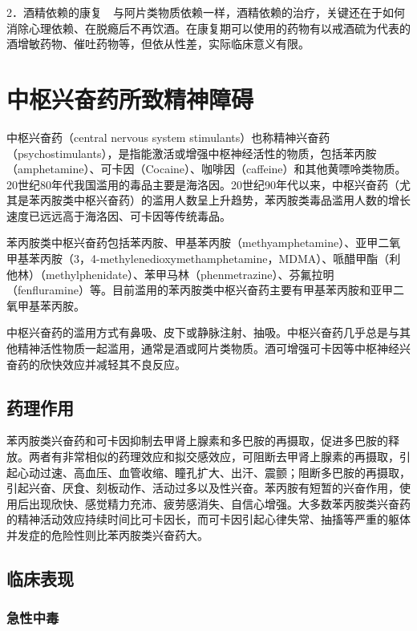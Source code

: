 2．酒精依赖的康复　与阿片类物质依赖一样，酒精依赖的治疗，关键还在于如何消除心理依赖、在脱瘾后不再饮酒。在康复期可以使用的药物有以戒酒硫为代表的酒增敏药物、催吐药物等，但依从性差，实际临床意义有限。

\section{中枢兴奋药所致精神障碍}

中枢兴奋药（central nervous system
stimulants）也称精神兴奋药（psychostimulants），是指能激活或增强中枢神经活性的物质，包括苯丙胺（amphetamine）、可卡因（Cocaine）、咖啡因（caffeine）和其他黄嘌呤类物质。20世纪80年代我国滥用的毒品主要是海洛因。20世纪90年代以来，中枢兴奋药（尤其是苯丙胺类中枢兴奋药）的滥用人数呈上升趋势，苯丙胺类毒品滥用人数的增长速度已远远高于海洛因、可卡因等传统毒品。

苯丙胺类中枢兴奋药包括苯丙胺、甲基苯丙胺（methyamphetamine）、亚甲二氧甲基苯丙胺（3，4-methylenedioxymethamphetamine，MDMA）、哌醋甲酯（利他林）（methylphenidate）、苯甲马林（phenmetrazine）、芬氟拉明（fenfluramine）等。目前滥用的苯丙胺类中枢兴奋药主要有甲基苯丙胺和亚甲二氧甲基苯丙胺。

中枢兴奋药的滥用方式有鼻吸、皮下或静脉注射、抽吸。中枢兴奋药几乎总是与其他精神活性物质一起滥用，通常是酒或阿片类物质。酒可增强可卡因等中枢神经兴奋药的欣快效应并减轻其不良反应。

\subsection{药理作用}

苯丙胺类兴奋药和可卡因抑制去甲肾上腺素和多巴胺的再摄取，促进多巴胺的释放。两者有非常相似的药理效应和拟交感效应，可阻断去甲肾上腺素的再摄取，引起心动过速、高血压、血管收缩、瞳孔扩大、出汗、震颤；阻断多巴胺的再摄取，引起兴奋、厌食、刻板动作、活动过多以及性兴奋。苯丙胺有短暂的兴奋作用，使用后出现欣快、感觉精力充沛、疲劳感消失、自信心增强。大多数苯丙胺类兴奋药的精神活动效应持续时间比可卡因长，而可卡因引起心律失常、抽搐等严重的躯体并发症的危险性则比苯丙胺类兴奋药大。

\subsection{临床表现}

\subsubsection{急性中毒}


